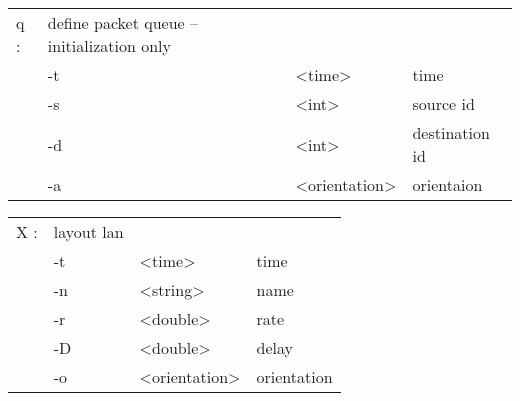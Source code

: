   \begin{tabular}{llll}
  q : & define packet queue -- initialization only & & \\
    &  -t & <time> & time \\
    &  -s & <int> & source id \\
    &  -d & <int> & destination id \\
    &  -a & <orientation> & orientaion \\
  \end{tabular}

  \begin{tabular}{llll}
  X : & layout lan & & \\
    &  -t & <time> & time \\
    &  -n & <string> & name \\
    &  -r & <double> & rate \\
    &  -D & <double> & delay \\
    &  -o & <orientation> & orientation \\
  \end{tabular}

